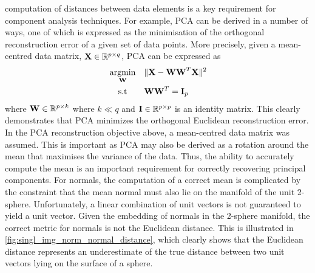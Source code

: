 computation of distances between data elements is a key requirement for
component analysis techniques. For example, PCA can be derived in a number of
ways, one of which is expressed as the minimisation of the orthogonal
reconstruction error of a given set of data points. More precisely, given
a mean-centred data matrix, $\boldsymbol{\mathbf{X}} \in \mathbb{R}^{p \times q}$, PCA can be expressed
as
\begin{equation*}
\begin{alignedat}{2}
	&\argmin_{\bb{W}} \quad &&\lVert \bb{X} - \bb{W} \bb{W}^T \bb{X} \rVert^2 \\
	&\quad \, \st      &&\bb{W} \bb{W}^T = \bb{I}_p
\end{alignedat}
\end{equation*}
where $\boldsymbol{\mathbf{W}} \in \mathbb{R}^{p \times k}$ where $k \ll q$ and
$\boldsymbol{\mathbf{I}} \in \mathbb{R}^{p \times p}$ is an identity matrix. This clearly demonstrates
that PCA minimizes the orthogonal Euclidean reconstruction error. In the PCA
reconstruction objective above, a mean-centred data matrix was assumed. This is
important as PCA may also be derived as a rotation around the mean that
maximises the variance of the data. Thus, the ability to accurately compute the 
mean is an important requirement for correctly recovering principal components.
For normals, the computation of a correct mean
is complicated by the constraint that the mean normal must also lie on the
manifold of the unit 2-sphere. Unfortunately, a linear combination of unit
vectors is not guaranteed to yield a unit vector. Given the embedding of normals
in the 2-sphere manifold, the correct metric for normals is not the Euclidean
distance. This is illustrated in
\cref{fig:singl_img_norm_normal_distance}, which clearly shows that the Euclidean
distance represents an underestimate of the true distance between two unit
vectors lying on the surface of a sphere.
